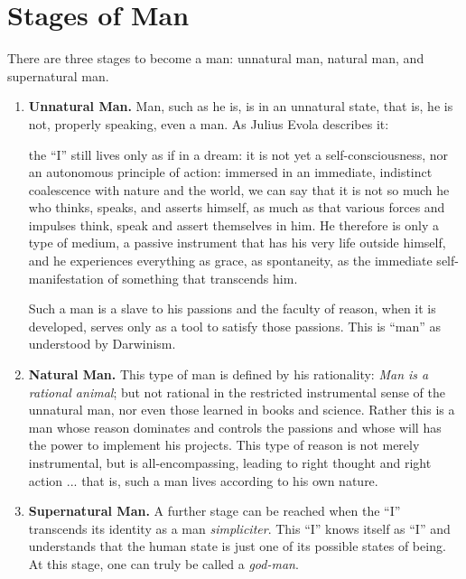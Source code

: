 \section{Stages of Man}

There are three stages to become a man: unnatural man, natural man, and supernatural man.

\begin{enumerate}

\item \textbf{Unnatural Man.} Man, such as he is, is in an unnatural state, that is, he is not, properly speaking, even a man. As Julius Evola describes it:

\begin{quotex}
the ``I'' still lives only as if in a dream: it is not yet a self-consciousness, nor an autonomous principle of action: immersed in an immediate, indistinct coalescence with nature and the world, we can say that it is not so much he who thinks, speaks, and asserts himself, as much as that various forces and impulses think, speak and assert themselves in him. He therefore is only a type of medium, a passive instrument that has his very life outside himself, and he experiences everything as grace, as spontaneity, as the immediate self-manifestation of something that transcends him. 
\end{quotex}


Such a man is a slave to his passions and the faculty of reason, when it is developed, serves only as a tool to satisfy those passions. This is ``man'' as understood by Darwinism.

\item \textbf{Natural Man.} This type of man is defined by his rationality: \emph{Man is a rational animal}; but not rational in the restricted instrumental sense of the unnatural man, nor even those learned in books and science. Rather this is a man whose reason dominates and controls the passions and whose will has the power to implement his projects. This type of reason is not merely instrumental, but is all-encompassing, leading to right thought and right action ... that is, such a man lives according to his own nature.

\item \textbf{Supernatural Man.} A further stage can be reached when the ``I'' transcends its identity as a man \emph{simpliciter}. This ``I'' knows itself as ``I'' and understands that the human state is just one of its possible states of being. At this stage, one can truly be called a \emph{god-man}.
\end{enumerate}




